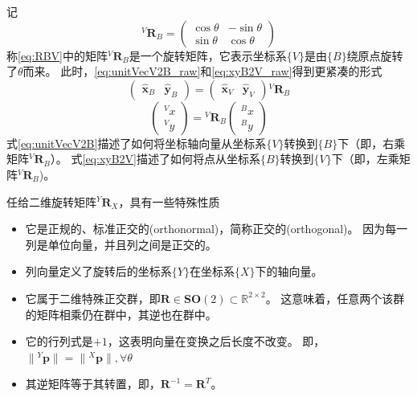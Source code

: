 \documentclass[UTF8,a4paper,10pt]{ctexart}
\begin{document}
记
\begin{equation}\label{eq:RBV}
  {}^V\mathbf{R}_B=
  \begin{pmatrix}\cos\theta  & -\sin\theta\\\sin\theta & \cos\theta\end{pmatrix}
\end{equation}
称\eqref{eq:RBV}中的矩阵${}^V\mathbf{R}_B$是一个旋转矩阵，它表示坐标系$\{V\}$是由$\{B\}$绕原点旋转了$\theta$而来。
此时，\eqref{eq:unitVecV2B_raw}和\eqref{eq:xyB2V_raw}得到更紧凑的形式
\begin{equation}\label{eq:unitVecV2B}
  \begin{pmatrix}\hat{\mathbf{x}}_B&\hat{\mathbf{y}}_B\end{pmatrix}=
  \begin{pmatrix}\hat{\mathbf{x}}_V&\hat{\mathbf{y}}_V\end{pmatrix}
  {}^V\mathbf{R}_B
\end{equation}
\begin{equation}\label{eq:xyB2V}
  \begin{pmatrix}{}^Vx\\{}^Vy\end{pmatrix}=
  {}^V\mathbf{R}_B
  \begin{pmatrix}{}^Bx\\{}^By\end{pmatrix}
\end{equation}
式\eqref{eq:unitVecV2B}描述了如何将坐标轴向量从坐标系$\{V\}$转换到$\{B\}$下（即，右乘矩阵${}^V\mathbf{R}_B$）。
式\eqref{eq:xyB2V}描述了如何将点从坐标系$\{B\}$转换到$\{V\}$下（即，左乘矩阵${}^V\mathbf{R}_B$)。

任给二维旋转矩阵${}^Y\mathbf{R}_X$，具有一些特殊性质
\begin{itemize}
\item 它是正规的、标准正交的(orthonormal)，简称正交的(orthogonal)。
  因为每一列是单位向量，并且列之间是正交的。
\item 列向量定义了旋转后的坐标系$\{Y\}$在坐标系$\{X\}$下的轴向量。
\item 它属于二维特殊正交群，即$\mathbf{R}\in\mathbf{SO}(2)\subset\mathbb{R}^{2\times2}$。
  这意味着，任意两个该群的矩阵相乘仍在群中，其逆也在群中。
\item 它的行列式是$+1$，这表明向量在变换之后长度不改变。
  即，$\|{}^Y\mathbf{p}\|=\|{}^X\mathbf{p}\|, \forall\theta$
\item 其逆矩阵等于其转置，即，$\mathbf{R}^{-1}=\mathbf{R}^{T}$。
\end{itemize}
\end{document}
